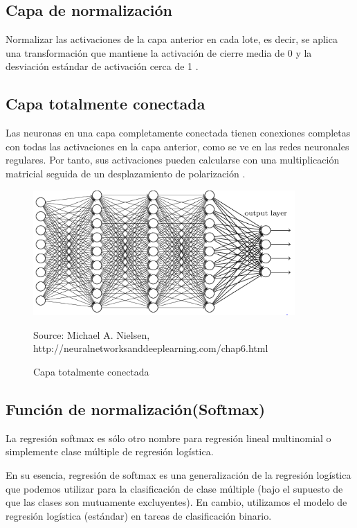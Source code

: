 \subsection{Capa de normalización}
Normalizar las activaciones de la capa anterior en cada lote, es decir, se aplica una
transformación que mantiene la activación de cierre media de 0 y la desviación estándar
de activación cerca de 1 \cite{22RedesNeuronalesConvolu}.

\subsection{Capa totalmente conectada}
Las neuronas en una capa completamente conectada tienen conexiones completas con
todas las activaciones en la capa anterior, como se ve en las redes neuronales regulares.
Por tanto, sus activaciones pueden calcularse con una multiplicación matricial seguida de
un desplazamiento de polarización \cite{22RedesNeuronalesConvolu}.


\begin{figure}[H]
		\centering
		\includegraphics[width=100mm]{./Imagenes/grafico_full_conect.png}
		\caption{Capa totalmente conectada}
		Source: Michael A. Nielsen, http://neuralnetworksanddeeplearning.com/chap6.html
		\label{fig:grafico_full_conect}
\end{figure}

\subsection{Función de normalización(Softmax)}
La regresión softmax es sólo otro nombre para regresión lineal multinomial o
simplemente clase múltiple de regresión logística.

En su esencia, regresión de softmax es una generalización de la regresión logística
que podemos utilizar para la clasificación de clase múltiple (bajo el supuesto de que las
clases son mutuamente excluyentes). En cambio, utilizamos el modelo de regresión
logística (estándar) en tareas de clasificación binario.

